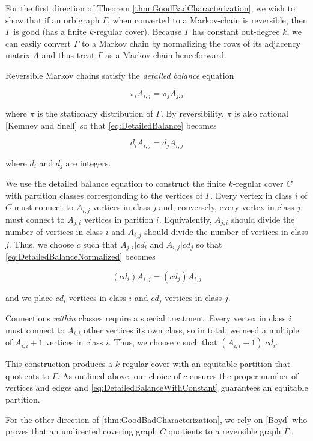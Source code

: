 For the first direction of Theorem \ref{thm:GoodBadCharacterization}, we wish to show that if an orbigraph $\Gamma$, when converted to a Markov-chain is reversible, then $\Gamma$ is good (has a finite $k$-regular cover). Because $\Gamma$ has constant out-degree $k$, we can easily convert $\Gamma$ to a Markov chain by normalizing the rows of its adjacency matrix $A$ and thus treat $\Gamma$ as a Markov chain henceforward.

Reversible Markov chains satisfy the \textit{detailed balance} equation 

\begin{equation}\label{eq:DetailedBalance}
	\pi_i A_{ i, j } = \pi_j A_{ j, i }
\end{equation}

where $\pi$ is the stationary distribution of $\Gamma$. By reversibility, $\pi$ is also rational [Kemney and Snell] so that \ref{eq:DetailedBalance} becomes

\begin{equation} \label{eq:DetailedBalanceNormalized}
	d_i A_{i, j} = d_j A_{ i, j }
\end{equation}

where $d_i$ and $d_j$ are integers.

We use the detailed balance equation to construct the finite $k$-regular cover $C$ with partition classes corresponding to the vertices of $\Gamma$. Every vertex in class $i$ of $C$ must connect to $A_{i, j}$ vertices in class $j$ and, conversely, every vertex in class $j$ must connect to $A_{j, i}$ vertices in parition $i$.  Equivalently, $A_{j, i}$ should divide the number of vertices in class $i$ and $A_{i, j}$ should divide the number of vertices in class $j$. Thus, we choose $c$ such that $A_{j, i} | c d_i$ and $A_{i, j} | c d_j$ so that \ref{eq:DetailedBalanceNormalized} becomes

\begin{equation} \label{eq:DetailedBalanceWithConstant}
	(c d_i) A_{ i, j } = (c d_j) A_{ i, j }
\end{equation}

and we place $c d_i$ vertices in class $i$ and $c d_j$ vertices in class $j$.

Connections \textit{within} classes require a special treatment. Every vertex in class $i$ must connect to $A_{i, i}$ other vertices its own class, so in total, we need a multiple of $A_{i, i} + 1$ vertices in class $i$. Thus, we choose $c$ such that $(A_{ i, i } + 1) | c d_i$. 

This construction produces a $k$-regular cover with an equitable partition that quotients to $\Gamma$. As outlined above, our choice of $c$ ensures the proper number of vertices and edges and \ref{eq:DetailedBalanceWithConstant} guarantees an equitable partition.

For the other direction of \ref{thm:GoodBadCharacterization}, we rely on [Boyd] who proves that an undirected covering graph $C$ quotients to a reversible graph $\Gamma$. 